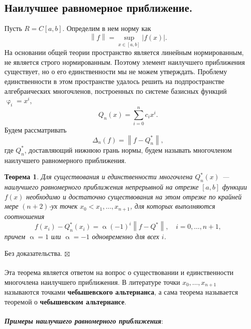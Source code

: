 \documentclass[a4paper, 12pt]{report}
\newenvironment{Proof} %
{\par\noindent{$\blacklozenge$}} %
{\hfill$\scriptstyle\boxtimes$}
\renewcommand{\alpha}{\upalpha}
\renewcommand{\varphi}{\upvarphi}
\newcommand\Norm[1]{\left\| #1 \right\|}
\newtheorem*{theorem}{Теорема}
\begin{document}
 	\subsection{Наилучшее равномерное приближение.}
 	Пусть $R = C[a,b]$. Определим в нем норму как $$\Norm{f} = \underset{x \in [a,b]}{\sup}|f(x)|.$$
 	На основании общей теории пространство является линейным нормированным, не является строго нормированным. Поэтому элемент наилучшего приближения существует, но о его единственности мы не можем утверждать. Проблему единственности в этом пространстве удалось решить на подпространстве алгебраических многочленов, построенных по системе базисных функций $\varphi_i = x^i$, $$Q_n(x) = \sum_{i=0}^{n}c_ix^i.$$
 	Будем рассматривать $$\Delta_n (f) = \Norm{f - Q^*_n},$$ где $Q^*_n$, доставляющий нижнюю грань нормы, будем называть многочленом наилучшего равномерного приближения.
 	\begin{theorem}
 	Для существования и единственности многочлена $Q_n^*(x)$ --- наилучшего равномерного приближения непрерывной на отрезке $[a,b]$ функции $f(x)$ необходимо и достаточно существования на этом отрезке по крайней мере $(n+2)$-ух точек $x_0<x_1,\ldots, x_{n+1}$, для которых выполняются соотношения $$f(x_i) - Q_n^*(x_i) = \alpha (-1)^i \Norm{f - Q^*},\quad i = 0,\ldots, n+1,$$
 	причем $\alpha = 1$ или $\alpha = -1$ одновременно для всех $i$.
 	 	\end{theorem}
 	 	\begin{Proof}
 	 		Без доказательства.
 	 	\end{Proof}\\\\
 	 Эта теорема является ответом на вопрос о существовании и единственности многочлена наилучшего приближения. В литературе точки $x_0,\ldots, x_{n+1}$ называются точками \textbf{чебышевского альтернанса}, а сама теорема называется теоремой о \textbf{чебышевском альтернансе}.\\\\
 	 \textbf{\textit{Примеры наилучшего равномерного приближения}}:
\end{document}
